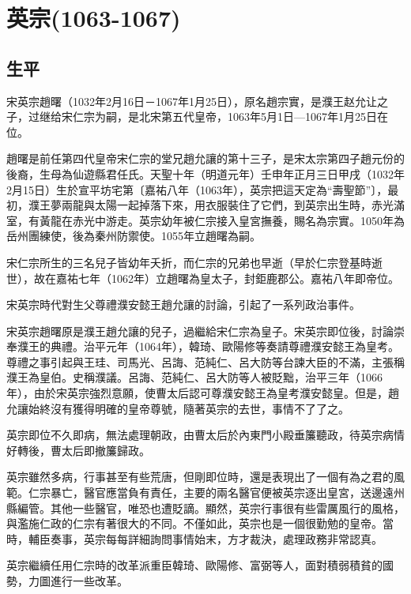 
\section{英宗\tiny(1063-1067)}

\subsection{生平}

宋英宗趙曙（1032年2月16日－1067年1月25日），原名趙宗實，是濮王赵允让之子，过继给宋仁宗为嗣，是北宋第五代皇帝，1063年5月1日—1067年1月25日在位。

趙曙是前任第四代皇帝宋仁宗的堂兄趙允讓的第十三子，是宋太宗第四子趙元份的後裔，生母為仙遊縣君任氏。天聖十年（明道元年）壬申年正月三日甲戌（1032年2月15日）生於宣平坊宅第〔嘉祐八年（1063年），英宗把這天定為“壽聖節”〕，最初，濮王夢兩龍與太陽一起掉落下來，用衣服裝住了它們，到英宗出生時，赤光滿室，有黃龍在赤光中游走。英宗幼年被仁宗接入皇宮撫養，賜名為宗實。1050年為岳州團練使，後為秦州防禦使。1055年立趙曙為嗣。

宋仁宗所生的三名兒子皆幼年夭折，而仁宗的兄弟也早逝（早於仁宗登基時逝世），故在嘉祐七年（1062年）立趙曙為皇太子，封鉅鹿郡公。嘉祐八年即帝位。

宋英宗時代對生父尊禮濮安懿王趙允讓的討論，引起了一系列政治事件。

宋英宗趙曙原是濮王趙允讓的兒子，過繼給宋仁宗為皇子。宋英宗即位後，討論崇奉濮王的典禮。治平元年（1064年），韓琦、歐陽修等奏請尊禮濮安懿王為皇考。尊禮之事引起與王珪、司馬光、呂誨、范純仁、呂大防等台諫大臣的不滿，主張稱濮王為皇伯。史稱濮議。呂誨、范純仁、呂大防等人被貶黜，治平三年（1066年），由於宋英宗強烈意願，使曹太后認可尊濮安懿王為皇考濮安懿皇。但是，趙允讓始終沒有獲得明確的皇帝尊號，隨著英宗的去世，事情不了了之。

英宗即位不久即病，無法處理朝政，由曹太后於內東門小殿垂簾聽政，待英宗病情好轉後，曹太后即撤簾歸政。

英宗雖然多病，行事甚至有些荒唐，但剛即位時，還是表現出了一個有為之君的風範。仁宗暴亡，醫官應當負有責任，主要的兩名醫官便被英宗逐出皇宮，送邊遠州縣編管。其他一些醫官，唯恐也遭貶謫。顯然，英宗行事很有些雷厲風行的風格，與濫施仁政的仁宗有著很大的不同。不僅如此，英宗也是一個很勤勉的皇帝。當時，輔臣奏事，英宗每每詳細詢問事情始末，方才裁決，處理政務非常認真。

英宗繼續任用仁宗時的改革派重臣韓琦、歐陽修、富弼等人，面對積弱積貧的國勢，力圖進行一些改革。

